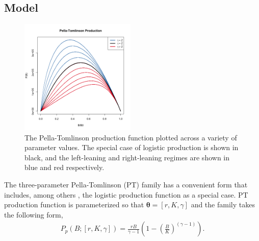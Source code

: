 \subsection{Model}

%
\begin{figure} %
\vspace{-1cm}
\includegraphics[width=0.49\textwidth]{../ptNew/g4PT.png}
\vspace{-1cm}
\caption{
The Pella-Tomlinson production function plotted across a variety of parameter
values. The special case of logistic production is shown in black, and the
left-leaning and right-leaning regimes are shown in blue and red respectively.
}
\label{SrrPT}
\end{figure}

%
\renewcommand{\baselinestretch}{2.5}
The three-parameter Pella-Tomlinson (PT) family has a convenient form that includes, among
others \cite{fox_jr_exponential_1970,rankin_alternative_2015}, the
logistic production function as a special case. %
PT production function is parameterized so that $\bm{\theta} = [r, K, \gamma]$
and the family takes the following form,
\begingroup
\footnotesize
\begin{align}
P_{p}(B; [r, K, \gamma]) = \frac{r B}{\gamma-1} \left(1-\left(\frac{B}{K}\right)^{(\gamma-1)}\right). \label{pt}
\end{align}
\endgroup

